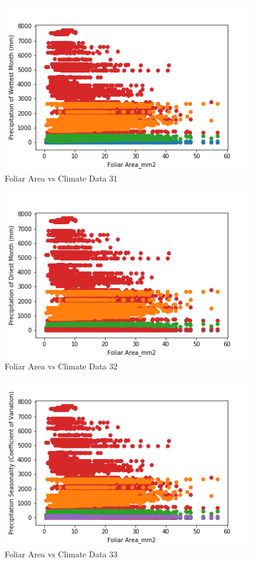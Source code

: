 \documentclass[letterpaper]{article}
\begin{document}
\begin{figure}[h]
\caption{Foliar Area vs Climate Data 31\label{fig:Foliar_Area_vs_31}}
\centering
\includegraphics[width=0.7\paperwidth]{Foliar_Area_vs_31}
\end{figure}


\begin{figure}[h]
\caption{Foliar Area vs Climate Data 32\label{fig:Foliar_Area_vs_32}}
\centering
\includegraphics[width=0.7\paperwidth]{Foliar_Area_vs_32}
\end{figure}


\begin{figure}[h]
\caption{Foliar Area vs Climate Data 33\label{fig:Foliar_Area_vs_33}}
\centering
\includegraphics[width=0.7\paperwidth]{Foliar_Area_vs_33}
\end{figure}
\end{document}
